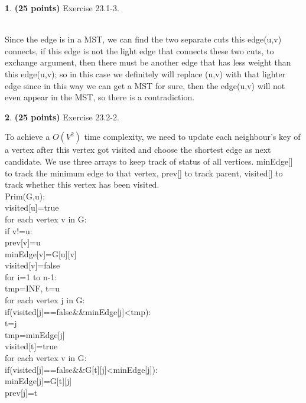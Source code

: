 \documentclass[11pt]{article}
\theoremstyle{definition}
\theoremstyle{theorem}
\newtheorem{prob}{}
\newcommand{\solution}{\medskip\noindent{\color{DarkBlue}\textbf{Solution:}}}
\begin{document}
\begin{prob} \textbf{(25 points)} Exercise 23.1-3.
\end{prob}
\solution\\
Since the edge is in a MST, we can find the two separate cuts this edge(u,v) connects, if this edge is not the light edge that connects these two cuts, to exchange argument, then there must be another edge that has less weight than this edge(u,v); so in this case we definitely will replace (u,v) with that lighter edge since in this way we can get a MST for sure, then the edge(u,v) will not even appear in the MST, so there is a contradiction.
\begin{prob} \textbf{(25 points)} Exercise 23.2-2.
\end{prob}
\solution
To achieve a $O(V^2)$ time complexity, we need to update each neighbour's key of a vertex after this vertex got visited and choose the shortest edge as next candidate. We use three arrays to keep track of status of all vertices. minEdge[] to track the minimum edge to that vertex, prev[] to track parent, visited[] to track whether this vertex has been visited.\\
Prim(G,u):\\
\null\qquad visited[u]=true\\
\null\qquad for each vertex v in G:\\
\null\qquad\qquad if v!=u:\\
\null\qquad\qquad\qquad prev[v]=u\\
\null\qquad\qquad\qquad minEdge[v]=G[u][v]\\
\null\qquad\qquad\qquad visited[v]=false\\
\null\qquad for i=1 to n-1:\\
\null\qquad\qquad tmp=INF, t=u\\
\null\qquad\qquad for each vertex j in G:\\
\null\qquad\qquad\qquad if(visited[j]==false\&\&minEdge[j]<tmp):\\
\null\qquad\qquad\qquad\qquad t=j\\
\null\qquad\qquad\qquad\qquad tmp=minEdge[j]\\
\null\qquad\qquad visited[t]=true\\
\null\qquad\qquad for each vertex v in G:\\
\null\qquad\qquad\qquad if(visited[j]==false\&\&G[t][j]<minEdge[j]):\\
\null\qquad\qquad\qquad\qquad minEdge[j]=G[t][j]\\
\null\qquad\qquad\qquad\qquad prev[j]=t\\
\end{document}
